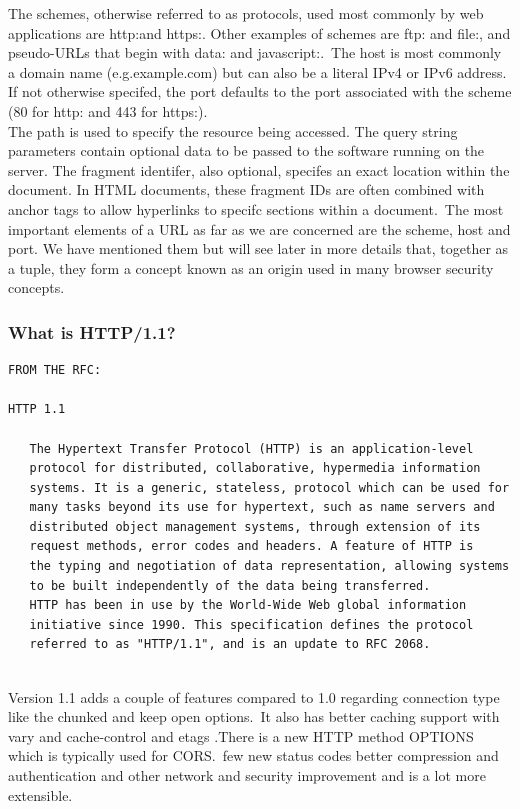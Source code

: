 \documentclass[a4paper,12pt]{paper}
\begin{document}
The schemes, otherwise referred to as protocols, used most commonly by web applications
are http:and https:. Other examples of schemes are ftp: and file:, and pseudo-URLs that begin with
data: and javascript:.\
The host is most commonly a domain name (e.g.example.com) but can also be a literal
IPv4 or IPv6 address. If not otherwise specifed, the port defaults to the port associated
with the scheme (80 for http: and 443 for https:).\\

The path is used to specify the resource being accessed. The query string parameters
contain optional data to be passed to the software running on the server. The fragment
identifer, also optional, specifes an exact location within the document. In HTML
documents, these fragment IDs are often combined with anchor tags to allow hyperlinks
to specifc sections within a document.\
The most important elements of a URL as far as we are concerned are the scheme, host
and port. We have mentioned them but will see later in more details that, together as a tuple, they form a concept known as
an origin used in many browser security concepts.\\

\subsubsection{What is HTTP/1.1?}

\begin{verbatim}
FROM THE RFC:

HTTP 1.1

   The Hypertext Transfer Protocol (HTTP) is an application-level
   protocol for distributed, collaborative, hypermedia information
   systems. It is a generic, stateless, protocol which can be used for
   many tasks beyond its use for hypertext, such as name servers and
   distributed object management systems, through extension of its
   request methods, error codes and headers. A feature of HTTP is
   the typing and negotiation of data representation, allowing systems
   to be built independently of the data being transferred.
   HTTP has been in use by the World-Wide Web global information
   initiative since 1990. This specification defines the protocol
   referred to as "HTTP/1.1", and is an update to RFC 2068.
  
\end{verbatim}
 
Version 1.1 adds a couple of features compared to 1.0 regarding connection type like the chunked and keep open options.\
It also has better caching support with vary and cache-control and etags .There is a new HTTP method OPTIONS which is typically used for CORS.\
few new status codes better compression and authentication and other network and security improvement and is a lot more extensible.\\
  
\end{document}
